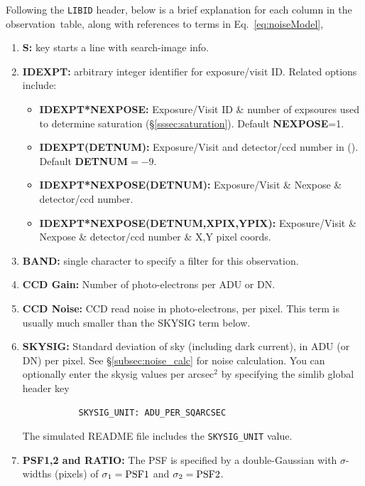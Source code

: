 \documentclass[12pt]{article}
\newcommand{\obs}{observation}
\begin{document}
{%
Following the {\tt LIBID} header,
below is a brief explanation for each column in the \obs\ table,
along with references to terms in Eq.~\ref{eq:noiseModel},
\begin{enumerate}
%
  \item  {\bf S:} key starts a line with search-image info.
%
  \item {\bf IDEXPT:} arbitrary integer identifier for exposure/visit ID. Related options include:
     \begin{itemize}
       \item {\bf IDEXPT*NEXPOSE:} Exposure/Visit ID \& number of expsoures used to determine saturation
            (\S\ref{sssec:saturation}). Default {\bf NEXPOSE}=1.
       \item {\bf IDEXPT(DETNUM):} Exposure/Visit and detector/ccd number in (). \\
            Default {\bf DETNUM}$=-9$.
       \item {\bf IDEXPT*NEXPOSE(DETNUM):} Exposure/Visit \& Nexpose \& detector/ccd number.
       \item {\bf IDEXPT*NEXPOSE(DETNUM,XPIX,YPIX):} Exposure/Visit \& Nexpose \& detector/ccd number \&
            X,Y pixel coords.
     \end{itemize}
%
  \item {\bf BAND:} single character to specify a filter for this observation.
%
  \item {\bf CCD Gain:} Number of photo-electrons per ADU or DN.
%
  \item {\bf CCD Noise:} CCD read noise in photo-electrons, per pixel.
        This term is usually much smaller than the SKYSIG term below.
%
  \item {\bf SKYSIG:}  Standard deviation of sky (including dark current), 
        in ADU (or DN) per pixel.
        See \S\ref{subsec:noise_calc} for noise calculation.
	You can optionally enter the skysig values per arcsec$^2$ 
	by specifying the simlib global header key 
        \vspace{-0.4cm}
	\begin{verbatim} 
           SKYSIG_UNIT: ADU_PER_SQARCSEC 
	\end{verbatim} 
        \vspace{-0.4cm}
	The simulated README file includes the {\tt SKYSIG\_UNIT}
	value.
%
  \item {\bf PSF1,2 and RATIO:} The PSF is specified by a double-Gaussian
         with $\sigma$-widths (pixels) of 
	 $\sigma_1 = {\rm PSF1}$ and 
	 $\sigma_2 = {\rm PSF2}$.

\end{enumerate}}
\end{document}
